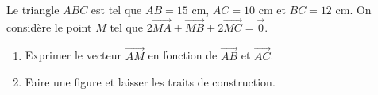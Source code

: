 
Le triangle $ABC$ est tel que $AB=15$ cm, $AC=10$ cm et $BC=12$ cm. On considère le point $M$ tel que $2\overrightarrow{MA}+\overrightarrow{MB}+2\overrightarrow{MC} = \overrightarrow{0}$.

\begin{enumerate}
\item Exprimer le vecteur $\overrightarrow{AM}$ en fonction de $\overrightarrow{AB}$ et $\overrightarrow{AC}$.
\item Faire une figure et laisser les traits de construction.
\end{enumerate}

